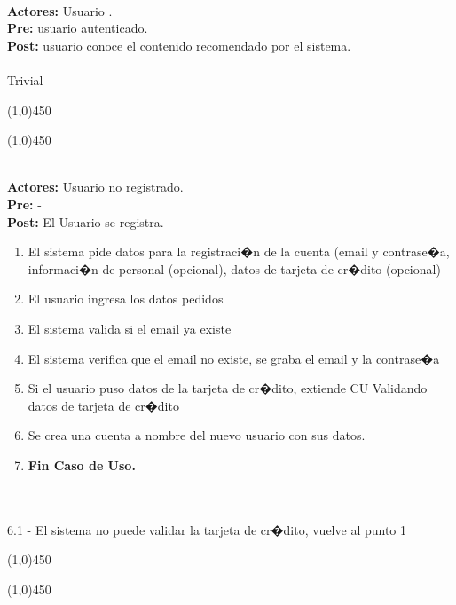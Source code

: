 \documentclass[11pt, a4paper, spanish]{article}
\begin{document}
 \\
\textbf{Actores:} Usuario . \\
\textbf{Pre:} usuario autenticado. \\
\textbf{Post:} usuario conoce el contenido recomendado por el sistema.\\
 \\
	Trivial\\
\begin{center} \line(1,0){450} \end{center}
\newpage
\begin{center} \line(1,0){450} \end{center}

 \\
\textbf{Actores:} Usuario no registrado. \\
\textbf{Pre:} - \\
\textbf{Post:} El Usuario se registra.\\
\begin{enumerate}
	\item El sistema pide datos para la registraci�n de la cuenta (email y contrase�a, informaci�n de personal (opcional), datos de tarjeta de cr�dito (opcional)
	\item El usuario ingresa los datos pedidos
	\item El sistema valida si el email ya existe
	\item El sistema verifica que el email no existe, se graba el email y la contrase�a
	\item Si el usuario puso datos de la tarjeta de cr�dito, extiende CU Validando datos de tarjeta de cr�dito
	\item Se crea una cuenta a nombre del nuevo usuario con sus datos.
	\item \textbf{Fin Caso de Uso.}
\end{enumerate}
 \\
\\
6.1 - El sistema no puede validar la tarjeta de cr�dito, vuelve al punto 1

\begin{center} \line(1,0){450} \end{center}
\newpage
\begin{center} \line(1,0){450} \end{center}
\end{document}
